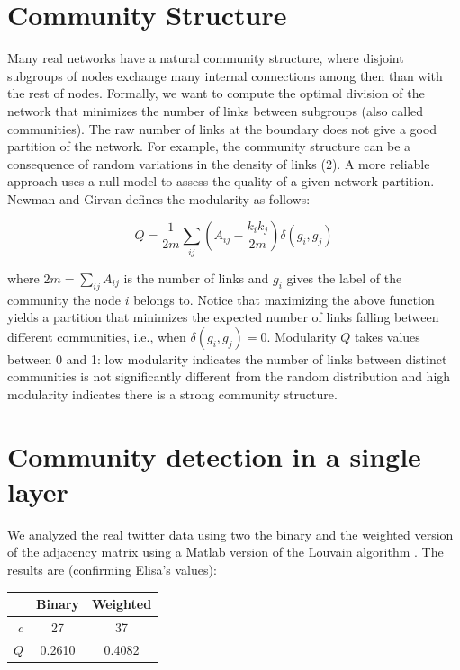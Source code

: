 \documentclass[12pt]{article}
\begin{document}
 

\section{Community Structure}

Many real networks have 
a natural community structure, where disjoint subgroups of nodes exchange many internal 
connections among then than with the rest of nodes. Formally, we want to compute the optimal 
division of the network that minimizes the number of links between subgroups (also called 
communities). The raw number of links at the boundary does not give a good partition of the 
network. For example, the community structure can be a consequence of random variations in
the density of links (2). A more reliable approach uses a null model to assess the quality of a 
given network partition. Newman and Girvan \cite{newman2004finding} defines the modularity as follows:

\begin{equation}
Q = \frac{1}{2m} \sum_{ij} \left( A_{ij} -
\frac{k_i k_j}{2m} \right) \delta(g_i,g_j)
\label{eq.q}
\end{equation}

where $2m = \sum_{ij} A_{ij}$ is the number of links and $g_i$
gives the label of the community the node $i$
belongs to. Notice that maximizing the above function yields a partition that minimizes the 
expected number of links falling between different communities, i.e., when 
$\delta(g_i, g_j) = 0$. 
Modularity $Q$ takes values between 0 and 1: low modularity indicates the number of links 
between distinct communities is not significantly different from the random distribution and high 
modularity indicates there is a strong community structure.

\section{Community detection in a single layer}

We analyzed the real twitter data using two the binary
and the weighted version of the adjacency matrix using
a Matlab version of the Louvain algorithm \cite{blondel2008fast}.
The results are (confirming Elisa's values):

\begin{center}
	\begin{tabular}{ | r | c | c |}
		\hline
		& Binary & Weighted\\ \hline
		$c$ & 27 & 37 \\ \hline
		$Q$ & 0.2610 & 0.4082 \\ \hline
	\end{tabular}
\end{center}
\end{document}
